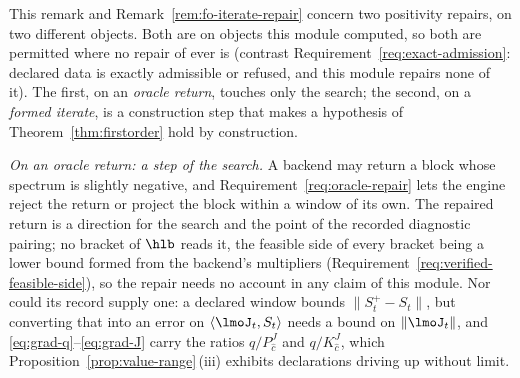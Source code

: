 
\begin{remark}\label{rem:fo-oracle-repair}
This remark and Remark~\ref{rem:fo-iterate-repair} concern two positivity
repairs, on two different objects. Both are on objects this module
computed, so both are permitted where no repair of 
ever is (contrast Requirement~\ref{req:exact-admission}: declared data is
exactly admissible or refused, and this module repairs none of it). The
first, on an \emph{oracle return}, touches only the search; the second, on
a \emph{formed iterate}, is a construction step that makes a hypothesis of
Theorem~\ref{thm:firstorder} hold by construction.

\emph{On an oracle return: a step of the search.} A backend may return a
block whose spectrum is slightly negative, and
Requirement~\ref{req:oracle-repair} lets the engine reject the return or
project the block within a window of its own. The repaired return is a
direction for the search and the point of the recorded diagnostic pairing;
no bracket of $\hlb$ reads it, the feasible side of every bracket being a
lower bound formed from the backend's multipliers
(Requirement~\ref{req:verified-feasible-side}), so the repair needs no
account in any claim of this module. Nor could its record supply one: a
declared window bounds $\|S_t^{+}-S_t\|$, but converting that into an error
on $\langle\lmoJ_t,S_t\rangle$ needs a bound on $\|\lmoJ_t\|$, and
\eqref{eq:grad-q}--\eqref{eq:grad-J} carry the ratios $q/P^{J}_{\hat c}$
and $q/K^{J}_{\hat c}$, which Proposition~\ref{prop:value-range}\,(iii)
exhibits declarations driving up without limit.
\end{remark}
